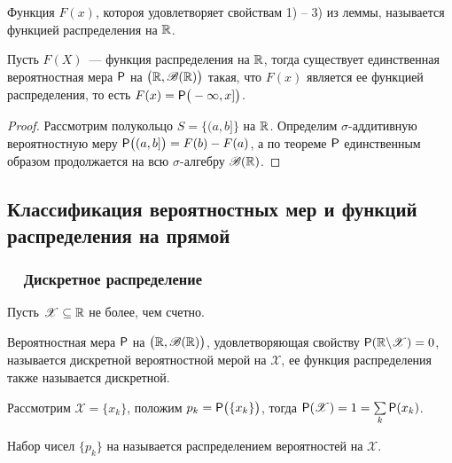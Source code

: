 \begin{definition}
	Функция $F(x)$, котороя удовлетворяет свойствам 1) -- 3) из леммы, называется функцией распределения на $\R$.
\end{definition}
\begin{theorem}
	Пусть $F(X)$~--- функция распределения на $\R$, тогда существует единственная вероятностная мера $\P$ на $\big(\R, \B(\R) \big)$ такая, что $F(x)$ является ее функцией распределения, то есть $F(x) = \P \big(-\infty, x] \big)$.
	\begin{proof}
		Рассмотрим полукольцо $ S = \big\{ (a, b] \big\}$ на $\R$. Определим $\sigma$-аддитивную вероятностную меру $\P \big( (a, b] \big) = F(b) - F(a)$, а по теореме $\P$ единственным образом продолжается на всю $\sigma$-алгебру $\B(\R)$.
	\end{proof}
\end{theorem}
\subsection*{Классификация вероятностных мер и функций распределения на прямой}
\subsubsection*{~~Дискретное распределение}
Пусть $\mathscr{X} \subseteq \R$ не более, чем счетно.
\begin{definition}
	Вероятностная мера $\P$ на $\big( \R, \B(\R) \big)$, удовлетворяющая свойству $\P(\R \backslash \mathscr{X}) = 0$, называется дискретной вероятностной мерой на $\mathscr{X}$, ее функция распределения также называется дискретной.
\end{definition}

Рассмотрим $\mathscr{X} = \{ x_k \}$, положим $p_k = \P \big( \{x_k \} \big)$, тогда $\P( \mathscr{X} ) = 1 = \sum\limits_{k} \P ( x_k )$.

\begin{definition}
	Набор чисел $\{ p_k \}$ на называется распределением вероятностей на $\mathscr{X}$.
\end{definition}


